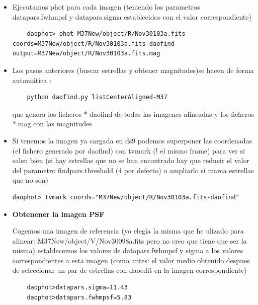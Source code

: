 \documentclass{article}
\begin{document}
\begin{itemize}
\begin{description}
\begin{verbatim}
\end{verbatim}

\end{description}
\item Ejecutamos phot para cada imagen (teniendo los parametros datapars.fwhmpsf y datapars.sigma establecidos con el valor correspondiente)
\begingroup
    \fontsize{10pt}{12pt}\selectfont
\begin{verbatim}
	daophot> phot M37New/object/R/Nov30103a.fits  coords=M37New/object/R/Nov30103a.fits-daofind output=M37New/object/R/Nov30103a.fits.mag
\end{verbatim}
\endgroup




\item Los pasos anteriores (buscar estrellas y obtener magnitudes)se hacen de forma automática :

\begin{verbatim}
	python daofind.py listCenterAligned-M37
\end{verbatim}
que genera los ficheros *-daofind de todas las imagenes alineadas y los ficheros *.mag con las magnitudes




\item Si tenemos la imagen ya cargada en ds9 podemos superponer las coordenadas (el fichero generado por daofind)
 con tvmark (! el mismo frame) para ver si salen bien
(si hay estrellas que no se han encontrado hay que reducir el valor del parametro  findpars.threshold (4 por defecto) o ampliarlo si marca estrellas que no son)

\begin{verbatim}
daophot> tvmark coords="M37New/object/R/Nov30103a.fits-daofind"
\end{verbatim}

\item \textbf{Obtenener la imagen PSF}

Cogemos una imagen de referencia (yo elegía la misma que he ulizado para alinear: M37New/object/V/Nov30098a.fits pero no creo que tiene que ser la misma) establecemos los valores de datapars.fwhmpsf y sigma a los valores correspondientes a esta imagen (como antes: el valor medio obtenido despues de seleccionar un par de estrellas con daoedit en la imagen correspondiente)

\begin{verbatim}
	daophot>datapars.sigma=11.43
	daophot>datapars.fwhmpsf=5.83
\end{verbatim}


\end{itemize}
\end{document}
